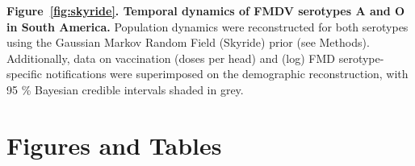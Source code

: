 \documentclass[10pt]{article}
\begin{document}
{\bf Figure~\ref{fig:skyride}. Temporal dynamics of FMDV serotypes A and O in South America.} Population dynamics were reconstructed for both serotypes using the Gaussian Markov Random Field (Skyride) prior (see Methods).
Additionally, data on vaccination  (doses per head) and (log) FMD serotype-specific notifications were superimposed on the demographic reconstruction, with 95 \% Bayesian credible intervals shaded in grey.

\newpage
\section{Figures and Tables}
\begin{figure}[!ht]
\begin{center}
\\

\end{center}
\end{figure}
\end{document}
